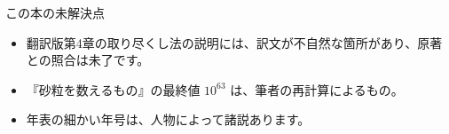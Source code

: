 \documentclass[a4paper,11pt,openany]{ltjsbook}
\begin{document}
\begin{notebox}{この本の未解決点}
\begin{itemize}[leftmargin=1.5em]
\item 翻訳版第4章の取り尽くし法の説明には、訳文が不自然な箇所があり、原著との照合は未了です。
\item 『砂粒を数えるもの』の最終値 $10^{63}$ は、筆者の再計算によるもの。
\item 年表の細かい年号は、人物によって諸説あります。
\end{itemize}
\end{notebox}
\end{document}
